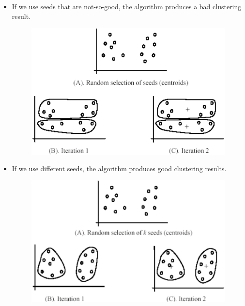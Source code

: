 \documentclass{book}
\begin{document}
\begin{enumerate}
    \begin{itemize}
        \item If we use seeds that are not-so-good, the algorithm produces a bad clustering result.
        \begin{figure}[h]
            \centering
            \includegraphics[scale=0.25]{chapter 5/ch5_figure11.jpeg}
        \end{figure}
        \newpage
        \item If we use different seeds, the algorithm produces good clustering results.
        \begin{figure}[h]
            \centering
            \includegraphics[scale=0.25]{chapter 5/ch5_figure12.jpeg}
        \end{figure}
    \end{itemize}
    

\end{enumerate}
\end{document}

